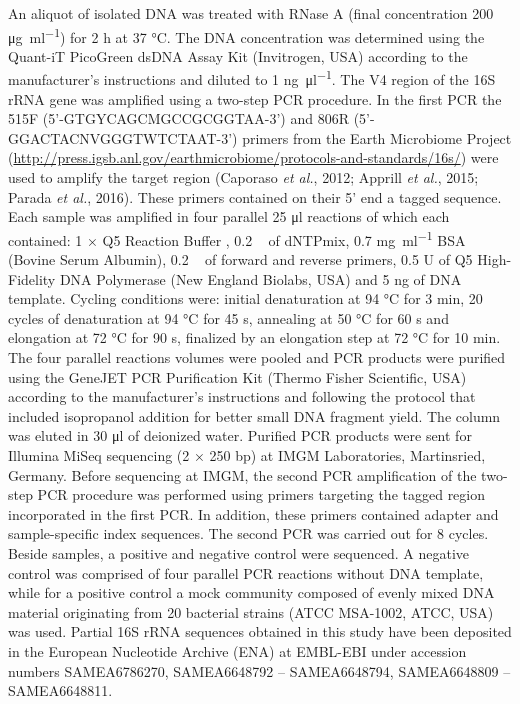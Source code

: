 \documentclass[12pt,]{article}
\begin{document}
An aliquot of isolated DNA was treated with RNase A (final concentration
200 \si{\ug\per\ml}) for 2 \si{\hour} at 37 \si{\degreeCelsius}. The DNA
concentration was determined using the Quant-iT PicoGreen dsDNA Assay
Kit (Invitrogen, USA) according to the manufacturer's instructions and
diluted to 1 \si{\ng\per\ul}. The V4 region of the 16S rRNA gene was
amplified using a two-step PCR procedure. In the first PCR the 515F
(5'-GTGYCAGCMGCCGCGGTAA-3') and 806R (5'-GGACTACNVGGGTWTCTAAT-3')
primers from the Earth Microbiome Project
(\url{http://press.igsb.anl.gov/earthmicrobiome/protocols-and-standards/16s/})
were used to amplify the target region (Caporaso \emph{et al.}, 2012;
Apprill \emph{et al.}, 2015; Parada \emph{et al.}, 2016). These primers
contained on their 5' end a tagged sequence. Each sample was amplified
in four parallel 25 \si{\ul} reactions of which each contained: 1 × Q5
Reaction Buffer , 0.2 \si{\milli\Molar} of dNTPmix, 0.7 \si{\mg\per\ml}
BSA (Bovine Serum Albumin), 0.2 \si{\micro\Molar} of forward and reverse
primers, 0.5 U of Q5 High-Fidelity DNA Polymerase (New England Biolabs,
USA) and 5 \si{\ng} of DNA template. Cycling conditions were: initial
denaturation at 94 \si{\degreeCelsius} for 3 \si{\minute}, 20 cycles of
denaturation at 94 \si{\degreeCelsius} for 45 \si{\s}, annealing at 50
\si{\degreeCelsius} for 60 \si{\s} and elongation at 72
\si{\degreeCelsius} for 90 \si{\s}, finalized by an elongation step at
72 \si{\degreeCelsius} for 10 \si{\minute}. The four parallel reactions
volumes were pooled and PCR products were purified using the GeneJET PCR
Purification Kit (Thermo Fisher Scientific, USA) according to the
manufacturer's instructions and following the protocol that included
isopropanol addition for better small DNA fragment yield. The column was
eluted in 30 \si{\ul} of deionized water. Purified PCR products were
sent for Illumina MiSeq sequencing (2 × 250 bp) at IMGM Laboratories,
Martinsried, Germany. Before sequencing at IMGM, the second PCR
amplification of the two-step PCR procedure was performed using primers
targeting the tagged region incorporated in the first PCR. In addition,
these primers contained adapter and sample-specific index sequences. The
second PCR was carried out for 8 cycles. Beside samples, a positive and
negative control were sequenced. A negative control was comprised of
four parallel PCR reactions without DNA template, while for a positive
control a mock community composed of evenly mixed DNA material
originating from 20 bacterial strains (ATCC MSA-1002, ATCC, USA) was
used. Partial 16S rRNA sequences obtained in this study have been
deposited in the European Nucleotide Archive (ENA) at EMBL-EBI under
accession numbers SAMEA6786270, SAMEA6648792 -- SAMEA6648794,
SAMEA6648809 -- SAMEA6648811.
\end{document}

